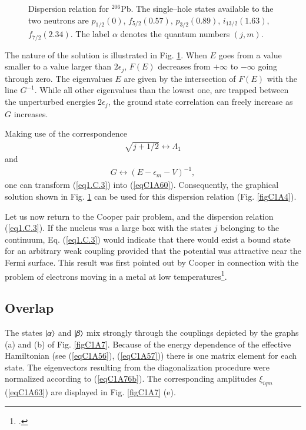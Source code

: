 \begin{subappendices}
\begin{figure}
{}
\caption{Dispersion relation for $^{206}$Pb. The single--hole states available to the two neutrons are $p_{1/2}(0)$, $f_{5/2}(0.57)$, $p_{3/2}(0.89)$, $i_{13/2}(1.63)$, $f_{7/2}(2.34)$. The label $\alpha$ denotes the quantum numbers $(j,m)$.}
\label{fig1.C.1}
\end{figure}
The nature of the solution is illustrated in Fig. \ref{fig1.C.1}. When $E$ goes from a value smaller to a value larger than $2\epsilon_j$, $F(E)$ decreases from $+\infty$ to $-\infty$ going through zero. The eigenvalues $E$ are given by the intersection of $F(E)$ with the line $G^{-1}$. While all other eigenvalues than the lowest one, are trapped between the unperturbed energies $2\epsilon_j$, the ground state correlation can freely increase as $G$ increases.


Making use of the correspondence
\begin{align}\label{eq1.C.4}
\sqrt{j+1/2}\leftrightarrow\Lambda_1
\end{align}
and
\begin{align}\label{eq1.C.5}
G\leftrightarrow(E-\epsilon_m-V)^{-1},
\end{align}
one can transform (\ref{eq1.C.3}) into (\ref{eqC1A60}). Consequently, the graphical solution shown in Fig. \ref{fig1.C.1} can be used for this dispersion relation (Fig. \ref{figC1A4}).

Let us now return to the Cooper pair problem, and the dispersion relation (\ref{eq1.C.3}). If the nucleus was a large box with the states $j$ belonging to the continuum, Eq. (\ref{eq1.C.3}) would indicate that there would exist a bound state for an arbitrary weak coupling provided that the potential was attractive near the Fermi surface. This result was first pointed out by Cooper in connection with the problem of electrons moving in a metal at low temperatures\footnote{\cite{Cooper:56,Bayman:60a}.}.
 \subsection{Overlap}\label{AppCS2}
 The states $|{\alpha} \rangle$ and $|{\beta} \rangle$ mix strongly through the couplings depicted by the graphs (a) and (b) of Fig. \ref{figC1A7}. Because of the energy dependence of the effective Hamiltonian (see (\ref{eqC1A56}), (\ref{eqC1A57})) there is one matrix element for each state. The eigenvectors resulting from the diagonalization procedure were normalized according to (\ref{eqC1A76b}). The corresponding amplitudes $\xi_{iqm}$ (\ref{eqC1A63}) are displayed in Fig. \ref{figC1A7} (e).
 

\end{subappendices}
